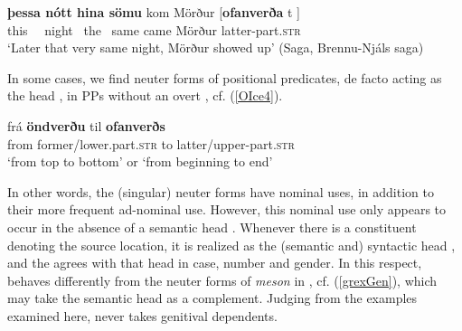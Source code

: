 \documentclass[output=paper,colorlinks,citecolor=brown]{langscibook}
\begin{document}
\begin{exe}
    \ex \label{st2} \gll  \textbf{þessa nótt hina sömu} kom Mörður [\textbf{ofanverða}   t ]   \\   
      {this \ \ night \ the \ same} came Mörður  latter-part.\textsc{str } \\ 
	   \glt `Later that very same night, Mörður showed up' (Saga, Brennu-Nj\'als saga)
\end{exe}


In some cases, we find neuter forms of positional predicates, de facto acting as the head , in PPs without an overt , cf. (\ref{OIce4}).


\begin{exe}
   \ex \label{OIce4}  
       
       \gll   frá \textbf{öndverðu} til \textbf{ofanverðs} \\ 
     from  former/lower.part.\textsc{str} to latter/upper-part.\textsc{str} \\ 
     \glt `from top to bottom' or `from beginning to end' 
\end{exe} 

 In other words, the (singular) neuter forms have nominal uses, in addition to their more frequent ad-nominal use. However, this nominal use only appears to occur in the absence of a semantic head . Whenever there is a constituent denoting the source location, it is realized as the (semantic and) syntactic head , and the  agrees with that head  in case, number and gender. In this respect,  behaves differently from the neuter forms of \textit{meson} in , cf. (\ref{grexGen}), which may take the semantic head  as a  complement. Judging from the examples examined here,  never takes genitival dependents. %
\end{document}
